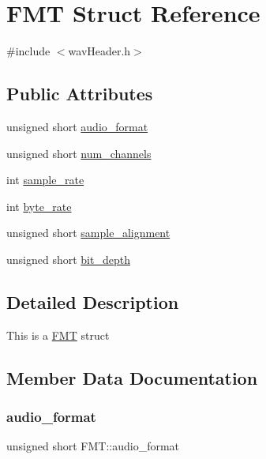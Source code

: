 \hypertarget{structFMT}{}\section{F\+MT Struct Reference}
\label{structFMT}


{\ttfamily \#include $<$wav\+Header.\+h$>$}

\subsection*{Public Attributes}
\begin{DoxyCompactItemize}
\item 
unsigned short \hyperlink{structFMT_a48bb016d6a5a04fb21e5fa5381117d61}{audio\+\_\+format}
\item 
unsigned short \hyperlink{structFMT_a28919c7db5b63cb70af4dc7f8405599e}{num\+\_\+channels}
\item 
int \hyperlink{structFMT_ad09f55ae3078ca9c3545204c4b241910}{sample\+\_\+rate}
\item 
int \hyperlink{structFMT_ada872d0d97744d55e35530140ac22003}{byte\+\_\+rate}
\item 
unsigned short \hyperlink{structFMT_a59c3f8f2f14ff86b8d10cfbf822f71e9}{sample\+\_\+alignment}
\item 
unsigned short \hyperlink{structFMT_a79e51e1ecd1fbb1de975ea73d07e3193}{bit\+\_\+depth}
\end{DoxyCompactItemize}


\subsection{Detailed Description}
This is a \hyperlink{structFMT}{F\+MT} struct 

\subsection{Member Data Documentation}
\mbox{\label{structFMT_a48bb016d6a5a04fb21e5fa5381117d61}} 
\subsubsection{\texorpdfstring{audio\+\_\+format}{audio\_format}}
{\footnotesize\ttfamily unsigned short F\+M\+T\+::audio\+\_\+format}

